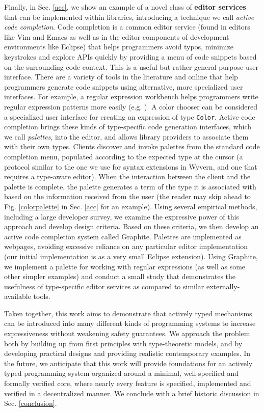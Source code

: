 Finally, in Sec. \ref{acc}, we show an example of a novel class of \textbf{editor services} that can be implemented within libraries, introducing a technique we call \emph{active code completion}. Code completion is a common editor service (found in editors like Vim and Emacs as well as in the editor components of development environments like Eclipse) that helps programmers avoid typos, minimize keystrokes and explore APIs quickly by providing a menu of code snippets based on the surrounding code context. This is a useful but rather general-purpose user interface. There are a variety of tools in the literature and online that help programmers generate code snippets using alternative, more specialized user interfaces. For example, a regular expression workbench helps programmers write regular expression patterns more easily (e.g. \cite{IntelliJRegexp,_txt2re:_????}). A color chooser can be considered a specialized user interface for creating an expression of type \verb|Color|. 
Active code completion brings these kinds of type-specific code generation interfaces, which we call \emph{palettes}, into the editor, and allows library providers to associate them with their own types. Clients discover and invoke palettes from the standard code completion menu, populated according to the expected type at the cursor (a protocol similar to the one we use for syntax extensions in Wyvern, and one that requires a type-aware editor). When the interaction between the client and the palette is complete, the palette generates a term of the type it is associated with based on the information received from the user (the reader may skip ahead to Fig. \ref{colorpalette} in Sec. \ref{acc} for an example). Using several empirical
methods, including a large developer survey, we examine the expressive power of this approach and develop design criteria. Based on these criteria, we then develop an active code completion system called Graphite. Palettes are implemented as webpages, avoiding excessive reliance on any particular editor implementation (our initial implementation is as a very small Eclipse extension). Using Graphite,
we implement a palette for working with regular expressions (as well as some other simpler examples) and conduct a small study that demonstrates the usefulness of type-specific editor services as compared to similar externally-available tools.

Taken together, this work aims to demonstrate that actively typed mechanisms can be introduced into many different kinds of programming systems to increase expressiveness without  weakening safety guarantees. We approach the problem both by building up from first principles with type-theoretic models, and by developing practical designs and providing realistic contemporary examples.  
In the future, we anticipate that this work will provide foundations for an actively typed programming system organized around a minimal, well-specified and formally verified core, where nearly every feature is specified, implemented and verified in a decentralized manner. We conclude with a brief historic discussion in Sec. \ref{conclusion}.


